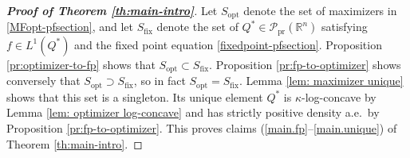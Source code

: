 \documentclass[11pt,reqno]{amsart}
\numberwithin{equation}{section}
\theoremstyle{definition}
\def\R{{\mathbb R}}
\def\P{{\mathcal P}}
\def\Pprod{\P_{\mathrm{pr}}}
\begin{document}
\begin{proof}[\textbf{Proof of Theorem \ref{th:main-intro}}]
	Let $S_{\mathrm{opt}}$ denote the set of maximizers  in \eqref{MFopt-pfsection}, and let $S_{\mathrm{fix}}$ denote the set of $Q^* \in \Pprod(\R^n)$ satisfying $f \in L^1(Q^*)$ and the fixed point equation \eqref{fixedpoint-pfsection}. 
	Proposition \ref{pr:optimizer-to-fp} shows that $S_{\mathrm{opt}} \subset S_{\mathrm{fix}}$. Proposition \ref{pr:fp-to-optimizer} shows conversely that $S_{\mathrm{opt}} \supset S_{\mathrm{fix}}$, so in fact $S_{\mathrm{opt}} = S_{\mathrm{fix}}$. Lemma \ref{lem: maximizer unique} shows that this set is a singleton. Its unique element $Q^*$ is $\kappa$-log-concave by Lemma \ref{lem: optimizer log-concave} and has strictly positive density a.e.\ by Proposition  \ref{pr:fp-to-optimizer}.
	This proves claims (\ref{main.fp}--\ref{main.unique}) of Theorem \ref{th:main-intro}.
	


\end{proof}
\end{document}

